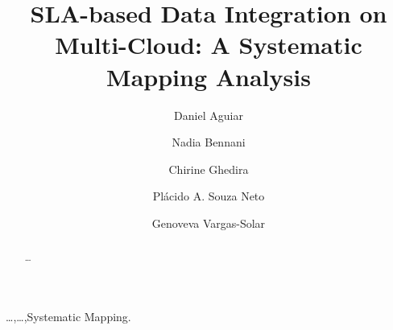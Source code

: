 \documentclass[preprint,12pt]{elsarticle}
\theoremstyle{plain}
\theoremstyle{plain}
\theoremstyle{plain}
\theoremstyle{plain}
\begin{document}
\begin{frontmatter}



\title{SLA-based Data Integration on Multi-Cloud: A Systematic Mapping Analysis}




\author[inst1]{Daniel Aguiar}
\author[inst2]{Nadia Bennani}
\author[inst1]{Chirine Ghedira}
\author[inst4]{Pl\'acido A. Souza Neto}
\author[inst5]{Genoveva Vargas-Solar}


\address[inst1]{Universit\'e Jean Moulin, Lyon 3 MAGELLAN, IAE -- France}
\address[inst2]{CNRS INSA-Lyon, LIRIS, UMR5205 -- France}
\address[inst4]{Instituto Federal do Rio Grande do Norte, Natal -- Brazil}
\address[inst5]{CNRS, LIG-LAFMIA, Saint Martin d'H\`eres -- France} 
  
\begin{abstract}

\ldots
\end{abstract}

\begin{keyword}
\ldots \sep \ldots \sep Systematic Mapping.


\end{keyword}

\end{frontmatter}
\end{document}
